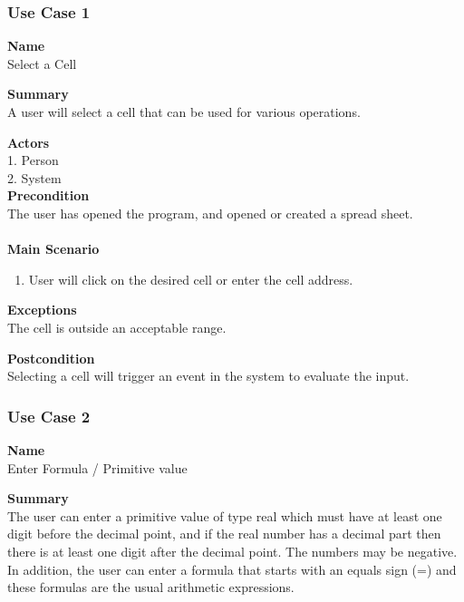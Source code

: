 \documentclass[12pt]{article}
\begin{document}
\clearpage

\subsubsection{Use Case 1} \label{uc:1}

\noindent
{\bf Name}\\
Select a Cell

\noindent
{\bf Summary}\\
A user will select a cell that can be used for various operations.

\noindent
{\bf Actors}\\
1. Person\\
2. System\\

\noindent
{\bf Precondition}\\
The user has opened the program, and opened or created a spread sheet.\\
\noindent\\
{\bf Main Scenario}\\
\vspace*{-0.2in}
\begin{enumerate}
\item User will click on the desired cell or enter the cell address.
\end{enumerate}

\noindent
{\bf Exceptions}\\
The cell is outside an acceptable range.

\noindent
{\bf Postcondition}\\
Selecting a cell will trigger an event in the system to evaluate the input.

\clearpage

\subsubsection{Use Case 2} \label{uc:2}

\noindent
{\bf Name}\\
Enter Formula / Primitive value

\noindent
{\bf Summary}\\
The user can enter a primitive value of type real which must have at least
one digit before the decimal point, and if the real number has a decimal part then there is
at least one digit after the decimal point. The numbers may be negative. In addition, the
user can enter a formula that starts with an equals sign (=) and these formulas are the usual
arithmetic expressions.
\end{document}
